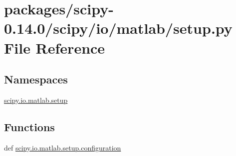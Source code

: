 \hypertarget{packages_2scipy-0_814_80_2scipy_2io_2matlab_2setup_8py}{}\section{packages/scipy-\/0.14.0/scipy/io/matlab/setup.py File Reference}
\label{packages_2scipy-0_814_80_2scipy_2io_2matlab_2setup_8py}
\subsection*{Namespaces}
\begin{DoxyCompactItemize}
\item 
 \hyperlink{namespacescipy_1_1io_1_1matlab_1_1setup}{scipy.\+io.\+matlab.\+setup}
\end{DoxyCompactItemize}
\subsection*{Functions}
\begin{DoxyCompactItemize}
\item 
def \hyperlink{namespacescipy_1_1io_1_1matlab_1_1setup_ad3a93643275e410ba5a76bcc515f5405}{scipy.\+io.\+matlab.\+setup.\+configuration}
\end{DoxyCompactItemize}
